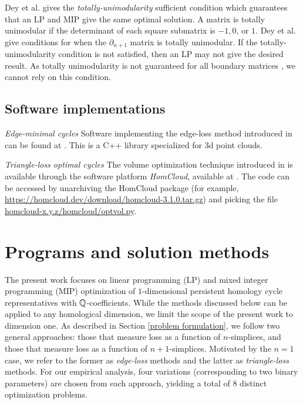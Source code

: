 Dey et al. \cite{dey2011optimal} gives the \textit{totally-unimodularity} sufficient condition which guarantees that an LP and MIP give the same optimal solution. A matrix is totally unimodular if the determinant of each square submatrix is $-1, 0$, or $1$. Dey et al. \cite{dey2011optimal} give conditions for when the $\partial_{n+1}$ matrix is totally unimodular. If the totally-unimodularity condition is not satisfied, then an LP may not give the desired result. As totally unimodularity is not guaranteed for all boundary matrices \cite{henselman2014combinatorial}, we cannot rely on this condition. 

\subsection{Software implementations}
\label{sec:existingimplementations}

\emph{Edge-minimal cycles}  Software implementing the edge-loss method introduced in \cite{Escolar2016} can be found at \cite{OptiPersLP}.  This is a C++ library specialized for 3d point clouds.


\emph{Triangle-loss optimal cycles} The volume optimization technique introduced in \cite{Obayashi2018} is available through the software platform \emph{HomCloud}, available at  \cite{homcloud}.  The code can be accessed by unarchiving the HomCloud package  (for example,
\url{https://homcloud.dev/download/homcloud-3.1.0.tar.gz}) and picking the
file \url{homcloud-x.y.z/homcloud/optvol.py}.






\section{Programs and solution methods}\label{methodsProblems}
\label{sec:programsandmethods}

The present work focuses on linear  programming (LP) and mixed integer programming (MIP) optimization of $1$-dimensional persistent homology cycle representatives with $\mathbb{Q}$-coefficients. While the methods discussed below can be applied to any homological dimension, we limit the scope of the present work to dimension one. As described in Section \ref{problem formulation}, we follow two general approaches: those that measure loss as a function of $n$-simplices, and those that measure loss as a function of $n+1$-simplices.  Motivated by the $n=1$ case, we refer to the former as \emph{edge-loss} methods and the latter as \emph{triangle-loss} methods.  
For our empirical analysis, four variations (corresponding to two binary parameters) are chosen from each approach, yielding a total of 8 distinct optimization problems. 


